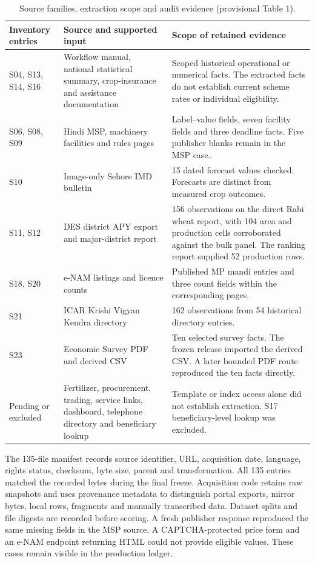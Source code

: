 \documentclass[11pt,a4paper]{article}
\begin{document}
\begin{table}[!ht]
\small
\caption{Source families, extraction scope and audit evidence (provisional Table 1).}
\label{tab:sources}
\begin{tabularx}{\linewidth}{@{}P{.18\linewidth}P{.24\linewidth}Y@{}}
\toprule
Inventory entries & Source and supported input & Scope of retained evidence\\
\midrule
S04, S13, S14, S16 & Workflow manual, national statistical summary, crop-insurance and assistance documentation & Scoped historical operational or numerical facts. The extracted facts do not establish current scheme rates or individual eligibility.\\
S06, S08, S09 & Hindi MSP, machinery facilities and rules pages & Label--value fields, seven facility fields and three deadline facts. Five publisher blanks remain in the MSP case.\\
S10 & Image-only Sehore IMD bulletin & 15 dated forecast values checked. Forecasts are distinct from measured crop outcomes.\\
S11, S12 & DES district APY export and major-district report & 156 observations on the direct Rabi wheat report, with 104 area and production cells corroborated against the bulk panel. The ranking report supplied 52 production rows.\\
S18, S20 & e-NAM listings and licence counts & Published MP mandi entries and three count fields within the corresponding pages.\\
S21 & ICAR Krishi Vigyan Kendra directory & 162 observations from 54 historical directory entries.\\
S23 & Economic Survey PDF and derived CSV & Ten selected survey facts. The frozen release imported the derived CSV. A later bounded PDF route reproduced the ten facts directly.\\
Pending or excluded & Fertilizer, procurement, trading, service links, dashboard, telephone directory and beneficiary lookup & Template or index access alone did not establish extraction. S17 beneficiary-level lookup was excluded.\\
\bottomrule
\end{tabularx}
\end{table}

The 135-file manifest records source identifier, URL, acquisition date, language, rights status, checksum, byte size, parent and transformation. All 135 entries matched the recorded bytes during the final freeze. Acquisition code retains raw snapshots and uses provenance metadata to distinguish portal exports, mirror bytes, local rows, fragments and manually transcribed data. Dataset splits and file digests are recorded before scoring. A fresh publisher response reproduced the same missing fields in the MSP source. A CAPTCHA-protected price form and an e-NAM endpoint returning HTML could not provide eligible values. These cases remain visible in the production ledger.
\end{document}
